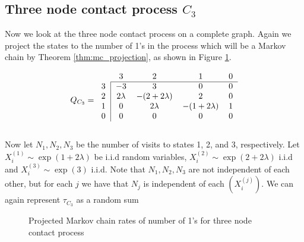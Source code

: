 \subsection{Three node contact process \texorpdfstring{$C_3$}{C3}}
Now we look at the three node contact process on a complete graph.
Again we project the states to the number of 1's in the process which will be a Markov chain by Theorem \ref{thm:mc_projection}, as shown in Figure \ref{fig:mc_three_contact}.

\begin{equation}
Q_{C_3} = \begin{blockarray}{ccccc}
    & 3 & 2 & 1 & 0\\
    \begin{block}{c|cccc}
    \cline{2-5}
        3 & -3 & 3 & 0 & 0 \\
        2 & 2\lambda & -(2 + 2 \lambda) &
        2 & 0\\
        1 & 0 & 2\lambda & -(1 + 2\lambda) & 1\\
    0 & 0 & 0 & 0 & 0\\
    \end{block}
\end{blockarray}
\end{equation}

Now let $N_1, N_2, N_3$ be the number of visits to states 1, 2, and 3, respectively.
Let $X_i^{(1)} \sim \exp(1 + 2\lambda)$ be i.i.d random variables, $X_i^{(2)} \sim \exp(2 + 2\lambda)$ i.i.d and $X_i^{(3)} \sim \exp(3)$ i.i.d.
Note that $N_1, N_2, N_3$ are not independent of each other, but for each $j$ we have that $N_j$ is independent of each $(X_i^{(j)})$.
We can again represent $\tau_{C_3}$ as a random sum

\begin{figure}[H]
    \centering
    \caption{Projected Markov chain rates of number of 1's for three node contact process}
    \label{fig:mc_three_contact}
\end{figure}


